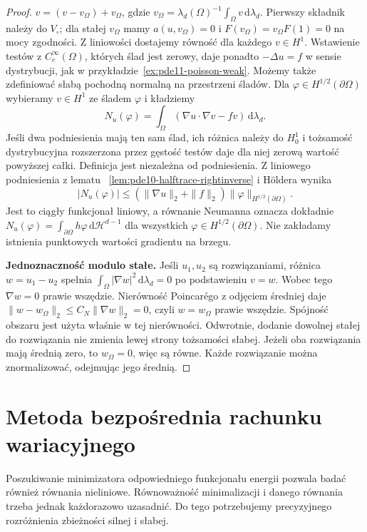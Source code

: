 \begin{proof}
$v=(v-v_\Omega)+v_\Omega$,
gdzie $v_\Omega=\lambda_d(\Omega)^{-1}
\int_\Omega v\,\mathrm d\lambda_d$.
Pierwszy składnik należy do $V_\circ$; dla stałej
$v_\Omega$ mamy $a(u,v_\Omega)=0$ i
$F(v_\Omega)=v_\Omega F(1)=0$ na mocy zgodności.
Z liniowości dostajemy równość dla każdego $v\in H^1$.
Wstawienie testów z $C_c^\infty(\Omega)$, których ślad
jest zerowy, daje ponadto $-\Delta u=f$ w sensie
dystrybucji, jak w przykładzie~\ref{ex:pde11-poisson-weak}.
Możemy także zdefiniować słabą pochodną normalną
na przestrzeni śladów. Dla $\varphi\in H^{1/2}(\partial\Omega)$
wybieramy $v\in H^1$ ze śladem $\varphi$ i kładziemy
\[
 N_u(\varphi)=\int_\Omega
       (\nabla u\cdot\nabla v-fv)\,\mathrm d\lambda_d.
\]
Jeśli dwa podniesienia mają ten sam ślad, ich różnica
należy do $H_0^1$ i tożsamość dystrybucyjna rozszerzona
przez gęstość testów daje dla niej zerową wartość
powyższej całki. Definicja jest niezależna od podniesienia.
Z liniowego podniesienia z lematu
~\ref{lem:pde10-halftrace-rightinverse} i Höldera wynika
\[
 |N_u(\varphi)|\le(\|\nabla u\|_2+\|f\|_2)
                      \|\varphi\|_{H^{1/2}(\partial\Omega)}.
\]
Jest to ciągły funkcjonał liniowy, a równanie Neumanna
oznacza dokładnie $N_u(\varphi)=\int_{\partial\Omega}
h\varphi\,\mathrm d\mathcal H^{d-1}$ dla wszystkich
$\varphi\in H^{1/2}(\partial\Omega)$.
Nie zakładamy istnienia punktowych wartości gradientu
na brzegu.

\textbf{Jednoznaczność modulo stałe.} Jeśli $u_1,u_2$
są rozwiązaniami, różnica $w=u_1-u_2$ spełnia
$\int_\Omega|\nabla w|^2\,\mathrm d\lambda_d=0$
po podstawieniu $v=w$. Wobec tego $\nabla w=0$ prawie wszędzie.
Nierówność Poincarégo z odjęciem średniej daje
$\|w-w_\Omega\|_2\le C_N\|\nabla w\|_2=0$,
czyli $w=w_\Omega$ prawie wszędzie.
Spójność obszaru jest użyta właśnie w tej nierówności.
Odwrotnie, dodanie dowolnej stałej do rozwiązania
nie zmienia lewej strony tożsamości słabej.
Jeżeli oba rozwiązania mają średnią zero, to
$w_\Omega=0$, więc są równe. Każde rozwiązanie można
znormalizować, odejmując jego średnią.
\end{proof}

\section{Metoda bezpośrednia rachunku wariacyjnego}
\label{sec:pde11-direct}

Poszukiwanie minimizatora odpowiedniego funkcjonału energii
pozwala badać również równania nieliniowe. Równoważność
minimalizacji i danego równania trzeba jednak każdorazowo
uzasadnić.
Do tego potrzebujemy precyzyjnego rozróżnienia zbieżności
silnej i słabej.

